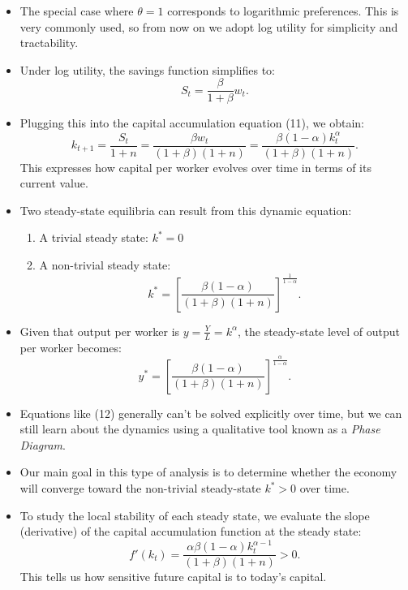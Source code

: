 \documentclass[12pt]{article}
\begin{document}
\begin{itemize}
\item The special case where \( \theta = 1 \) corresponds to logarithmic preferences. This is very commonly used, so from now on we adopt log utility for simplicity and tractability.

\item Under log utility, the savings function simplifies to:
\[
S_t = \frac{\beta}{1 + \beta} w_t.
\]

\item Plugging this into the capital accumulation equation (11), we obtain:
\[
k_{t+1} = \frac{S_t}{1 + n} = \frac{\beta w_t}{(1 + \beta)(1 + n)} = \frac{\beta (1 - \alpha) k_t^\alpha}{(1 + \beta)(1 + n)}. \tag{12}
\]
This expresses how capital per worker evolves over time in terms of its current value.

\item Two steady-state equilibria can result from this dynamic equation:
\begin{enumerate}
  \item A trivial steady state: \( k^* = 0 \)
  \item A non-trivial steady state:
  \[
  k^* = \left[ \frac{\beta (1 - \alpha)}{(1 + \beta)(1 + n)} \right]^{\frac{1}{1 - \alpha}}.
  \]
\end{enumerate}

\item Given that output per worker is \( y = \frac{Y}{L} = k^\alpha \), the steady-state level of output per worker becomes:
\[
y^* = \left[ \frac{\beta (1 - \alpha)}{(1 + \beta)(1 + n)} \right]^{\frac{\alpha}{1 - \alpha}}.
\]

\item Equations like (12) generally can’t be solved explicitly over time, but we can still learn about the dynamics using a qualitative tool known as a \textit{Phase Diagram}.

\item Our main goal in this type of analysis is to determine whether the economy will converge toward the non-trivial steady-state \( k^* > 0 \) over time.

\item To study the local stability of each steady state, we evaluate the slope (derivative) of the capital accumulation function at the steady state:
\[
f'(k_t) = \frac{\alpha \beta (1 - \alpha) k_t^{\alpha - 1}}{(1 + \beta)(1 + n)} > 0. \tag{13}
\]
This tells us how sensitive future capital is to today's capital.


\end{itemize}
\end{document}
